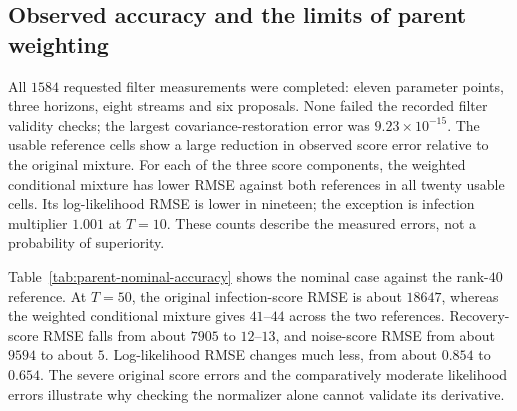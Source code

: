 \subsection{Observed accuracy and the limits of parent weighting}
\label{sec:observation-parent-accuracy}
All $1584$ requested filter measurements were completed: eleven parameter
points, three horizons, eight streams and six proposals. None failed the
recorded filter validity checks; the largest covariance-restoration error was
$9.23\times10^{-15}$. The usable reference cells show a large reduction in
observed score error relative to the original mixture. For each of the three
score components, the weighted conditional mixture has lower RMSE against
both references in all twenty usable cells. Its log-likelihood RMSE is lower
in nineteen; the exception is infection multiplier $1.001$ at $T=10$.
These counts describe the measured errors, not a probability of superiority.

Table~\ref{tab:parent-nominal-accuracy} shows the nominal case against the
rank-$40$ reference. At $T=50$, the original infection-score RMSE is about
$18647$, whereas the weighted conditional mixture gives $41$--$44$ across the
two references. Recovery-score RMSE falls from about $7905$ to $12$--$13$,
and noise-score RMSE from about $9594$ to about $5$. Log-likelihood RMSE changes
much less, from about $0.854$ to $0.654$. The severe original score errors and
the comparatively moderate likelihood errors illustrate why checking the
normalizer alone cannot validate its derivative.

